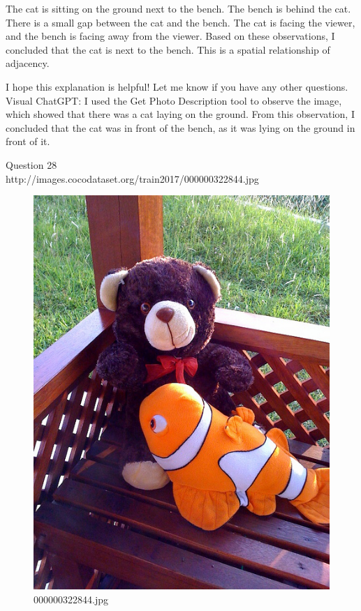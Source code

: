 \begin{enumerate}
        The cat is sitting on the ground next to the bench.
        The bench is behind the cat.
        There is a small gap between the cat and the bench.
        The cat is facing the viewer, and the bench is facing away from the viewer.
        Based on these observations, I concluded that the cat is next to the bench. This is a spatial relationship of adjacency.
        
        I hope this explanation is helpful! Let me know if you have any other questions.
        \subitem Visual ChatGPT: I used the Get Photo Description tool to observe the image, which showed that there was a cat laying on the ground. From this observation, I concluded that the cat was in front of the bench, as it was lying on the ground in front of it.
    \end{enumerate}
Question 28\\
    http://images.cocodataset.org/train2017/000000322844.jpg
    \begin{figure}[h]
        \centering
        \includegraphics[width=0.8\linewidth]{../image set/easy/000000322844.jpg}
        \caption{000000322844.jpg}
    \end{figure}
